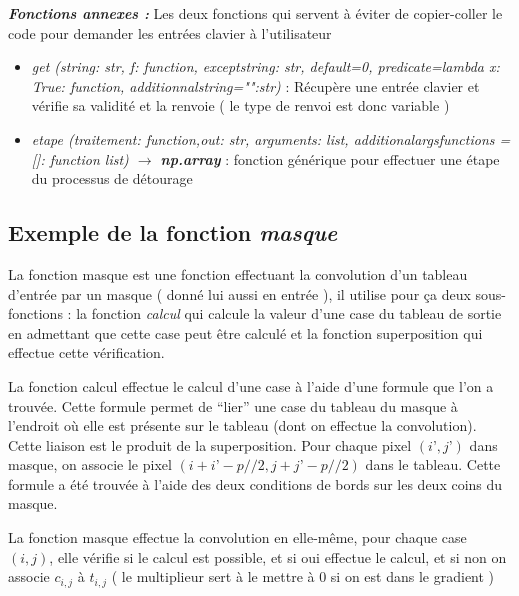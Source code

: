 \documentclass[hidelinks,11pt]{article}
\theoremstyle{mytheoremstyle}
\theoremstyle{mytheoremstyle}
\theoremstyle{myproblemstyle}
\begin{document}
    \textit{\textbf{Fonctions annexes : }} Les deux fonctions qui servent à éviter de copier-coller le code pour demander les entrées clavier à l'utilisateur
    \newline

    \begin{itemize}
        \item \textit{get (string: str, f: function, except\textunderscore string: str, default=0, predicate=lambda x: True: function, additionnal\textunderscore string="":str) }: Récupère une entrée clavier et vérifie sa validité et la renvoie ( le type de renvoi est donc variable )

        \item \textit{etape (traitement: function,out: str, arguments: list, additional\textunderscore args\textunderscore functions = []: function list) $\rightarrow$ \textbf{np.array} }: fonction générique pour effectuer une étape du processus de détourage
        
    \end{itemize}

    \subsection{Exemple de la fonction \textit{masque}}

    La fonction masque est une fonction effectuant la convolution d’un tableau d’entrée par un masque ( donné lui aussi en entrée ), 
    il utilise pour ça deux sous-fonctions : la fonction \textit{calcul} qui calcule la valeur d’une case du tableau de sortie en admettant que 
    cette case peut être calculé et la fonction superposition qui effectue cette vérification.\newline


    La fonction calcul effectue le calcul d’une case à l’aide d’une formule que l’on a trouvée. 
    Cette formule permet de “lier” une case du tableau du masque à l’endroit où elle est présente sur le tableau (dont on effectue la convolution). 
    Cette liaison est le produit de la superposition. Pour chaque pixel $(i’,j’)$ dans masque, on associe le pixel $(i+i’-p//2,j+j’-p//2)$ dans le tableau. 
    Cette formule a été trouvée à l’aide des deux conditions de bords sur les deux coins du masque.\newline

    La fonction masque effectue la convolution en elle-même, pour chaque case $(i,j)$, 
    elle vérifie si le calcul est possible, et si oui effectue le calcul, et si non on associe $c_{i,j}$ à $t_{i,j}$ 
    ( le multiplieur sert à le mettre à 0 si on est dans le gradient )\newline
\end{document}
